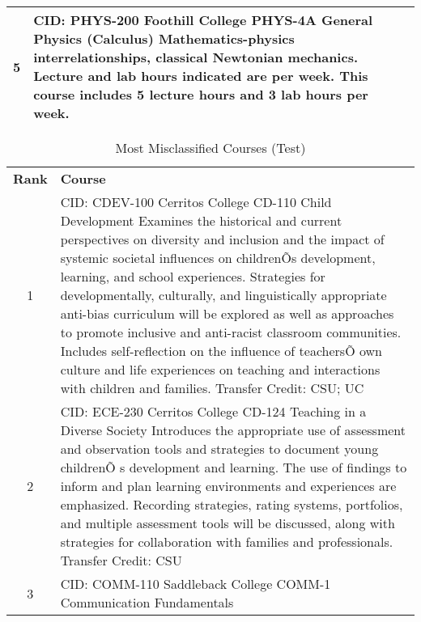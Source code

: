 \begin{longtable}{ >{\baselineskip=12pt}c >{\baselineskip=12pt}p{} }
\midrule
5 & CID: PHYS-200 \newline
Foothill College \newline
PHYS-4A General Physics (Calculus) \newline
Mathematics-physics interrelationships, classical Newtonian mechanics. Lecture and lab hours indicated are per week. This course includes 5 lecture hours and 3 lab hours per week.\\
\bottomrule
\end{longtable}

\begin{longtable}{ >{\baselineskip=12pt}c >{\baselineskip=12pt}p{} }
\captionsetup{skip=5pt}
\caption{Most Misclassified Courses (Test)}\label{tab:fp_overlap}\\
\toprule
\textbf{\textbf{Rank}} & \textbf{\textbf{Course}} \\
\midrule
\endhead
1 & CID: CDEV-100 \newline
Cerritos College \newline
CD-110 Child Development \newline
Examines the historical and current perspectives on diversity and inclusion and the impact of systemic societal influences on childrenÕs development, learning, and school experiences. Strategies for developmentally, culturally, and linguistically appropriate anti-bias curriculum will be explored as well as approaches to promote inclusive and anti-racist classroom communities. Includes self-reflection on the influence of teachersÕ own culture and life experiences on teaching and interactions with children and families.
Transfer Credit: CSU; UC\\
\midrule
2 & CID: ECE-230 \newline
Cerritos College \newline
CD-124 Teaching in a Diverse Society \newline
Introduces the appropriate use of assessment and observation tools and strategies to document young childrenÕ
s development and learning. The use of findings to inform and plan learning environments and experiences are
emphasized. Recording strategies, rating systems, portfolios, and multiple assessment tools will be
discussed, along with strategies for collaboration with families and professionals. 
Transfer Credit: CSU\\
\midrule
3 & CID: COMM-110 \newline
Saddleback College \newline
COMM-1 Communication Fundamentals \newline

\end{longtable}
